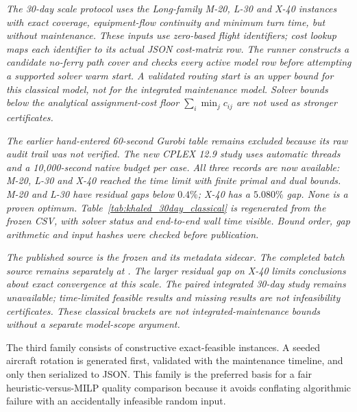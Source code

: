 \textit{The 30-day scale protocol uses the Long-family M-20, L-30 and X-40
instances with exact coverage, equipment-flow continuity and minimum turn time,
but without maintenance. These inputs use zero-based flight identifiers;
cost lookup maps each identifier to its actual JSON cost-matrix row. The runner
constructs a candidate no-ferry path cover and checks every active model row
before attempting a supported solver warm start. A validated routing start is
an upper bound for this classical model, not for the integrated maintenance
model. Solver bounds below the analytical assignment-cost floor
$\sum_i\min_j c_{ij}$ are not used as stronger certificates.}

\textit{The earlier hand-entered 60-second Gurobi table remains excluded because
its raw audit trail was not verified. The new CPLEX 12.9 study uses automatic
threads and a 10{,}000-second native budget per case. All three records
are now available: M-20, L-30 and X-40 reached the time limit with finite primal
and dual bounds. M-20 and L-30 have residual gaps below $0.4\%$; X-40 has a
$5.080\%$ gap. None is a proven optimum.
Table~\ref{tab:khaled_30day_classical} is regenerated from the frozen
CSV, with solver status and end-to-end wall time visible. Bound order, gap
arithmetic and input hashes were checked before publication.}



\textit{The published source is the frozen
and its metadata sidecar. The completed batch source remains separately at
.
The larger residual gap on X-40 limits conclusions about exact convergence
at this scale. The paired integrated 30-day study remains unavailable;
time-limited feasible results and missing results are not infeasibility
certificates. These classical brackets are not integrated-maintenance bounds
without a separate model-scope argument.}

The third family consists of constructive exact-feasible instances. A seeded
aircraft rotation is generated first, validated with the maintenance timeline,
and only then serialized to JSON. This family is the preferred basis for a fair
heuristic-versus-MILP quality comparison because it avoids conflating algorithmic
failure with an accidentally infeasible random input.

